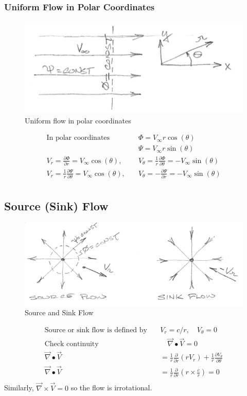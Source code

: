 \documentclass[draft=false, titlepage]{article}
\newcommand{\gradient}{\vec{\nabla}}
\newcommand{\partialfrac}[2]{\frac{\partial #1}{\partial #2}}
\begin{document}
\subsubsection{Uniform Flow in Polar Coordinates}
\begin{figure}[ht]
    \centering
    \includegraphics[width=0.5\linewidth]{Figures/UniformFlow.PNG}
    \caption{Uniform flow in polar coordinates}
    \label{fig:UniformFlow}
\end{figure}
\begin{align*}
    \text{In polar coordinates} \quad & \Phi = V_\infty r \cos(\theta) \\
    & \Psi = V_\infty r \sin(\theta) \\
    V_r = \partialfrac{\Phi}{r} = V_\infty \cos(\theta),\quad & V_\theta = \frac{1}{r} \partialfrac{\Phi}{\theta} = -V_\infty \sin(\theta) \\
    V_r = \frac{1}{r} \partialfrac{\Psi}{\theta} = V_\infty \cos(\theta), \quad & V_\theta = -\partialfrac{\Psi}{r} = -V_\infty \sin(\theta) \\
\end{align*}

\subsection{Source (Sink) Flow}
\begin{figure}[ht]
    \centering
    \includegraphics[width=0.8\linewidth]{Figures/sourceSinkFlow.PNG}
    \caption{Source and Sink Flow}
    \label{fig:SourceSinkFlow}
\end{figure}
\begin{align*}
\text{Source or sink flow is defined by} \quad & V_r = c/r,\quad V_\theta = 0\\
\text{Check continuity} & \quad \gradient \bullet \vec{V} = 0\\
\gradient \bullet \vec{V} &= \frac{1}{r} \partialfrac{}{r}(rV_r) + \frac{1}{r} \partialfrac{V_\theta}{\theta}\\
\gradient \bullet \vec{V} & =\frac{1}{r} \partialfrac{}{r} (r \times \frac{c}{r}) = 0\\
\end{align*}
Similarly, $\gradient \times \vec{V} = 0$ so the flow is irrotational.
\end{document}
